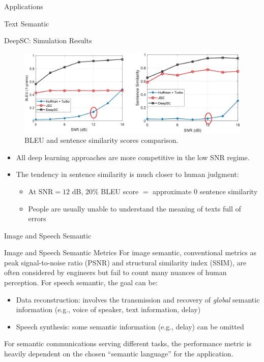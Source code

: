 \documentclass[presentation,mathserif,9pt]{beamer}
\begin{document}
\begin{section}{Applications}
\begin{subsection}{Text Semantic}
		\begin{frame}{DeepSC: Simulation Results}
			\begin{figure}
				\includegraphics[width=\textwidth]{assets/deepsc_scores.jpg}
				\caption{BLEU and sentence similarity scores comparison.}
			\end{figure}
			\begin{itemize}
				\item All deep learning approaches are more competitive in the low SNR regime.
				\item The tendency in sentence similarity is much closer to human judgment:
				\begin{itemize}
					\item At $\text{SNR}=12$ dB, $20\%$ BLEU score $=$ approximate $0$ sentence similarity
					\item People are usually unable to understand the meaning of texts full of errors
				\end{itemize}
			\end{itemize}
		\end{frame}
	\end{subsection}

	\begin{subsection}{Image and Speech Semantic}
		\begin{frame}{Image and Speech Semantic Metrics}
			For image semantic, conventional metrics as peak signal-to-noise ratio (PSNR) and structural similarity index (SSIM), are often considered by engineers but fail to count many nuances of human perception.
			\singlespacing
			For speech semantic, the goal can be:
			\begin{itemize}
				\item Data reconstruction: involves the transmission and recovery of \emph{global} semantic information (e.g., voice of speaker, text information, delay)
				\item Speech synthesis: some semantic information (e.g., delay) can be omitted
			\end{itemize}
			\singlespacing
			For semantic communications serving different tasks, the performance metric is heavily dependent on the chosen ``semantic language'' for the application.
		\end{frame}


\end{subsection}
\end{section}
\end{document}
